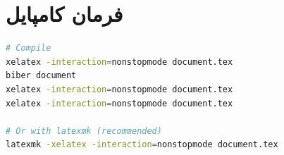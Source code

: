 \documentclass[12pt,a4paper,twoside]{book}
\begin{document}
\section{فرمان کامپایل}

\begin{latin}
\begin{lstlisting}[language=bash,
  caption={دستورات کامپایل}]
# Compile
xelatex -interaction=nonstopmode document.tex
biber document
xelatex -interaction=nonstopmode document.tex
xelatex -interaction=nonstopmode document.tex

# Or with latexmk (recommended)
latexmk -xelatex -interaction=nonstopmode document.tex
\end{lstlisting}
\end{latin}

\backmatter

\theendnotes

\printbibliography[title={کتاب‌نامه}]
\end{document}
